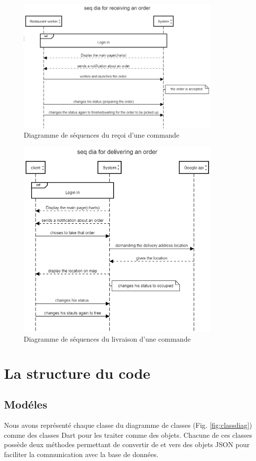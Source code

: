 \documentclass[french, a4paper, french]{report}
\begin{document}
			\begin{figure}[!h]
  				\center
  				\includegraphics[width=10cm]{seqrest.png}
  				\caption{Diagramme de séquences du reçoi d'une commande}
  				\label{fig:seqrest}
			\end{figure}
			\begin{figure}[!h]
  				\center
  				\includegraphics[width=10cm]{seqdeliver.png}
  				\caption{Diagramme de séquences du livraison d'une commande}
  				\label{fig:seqdeliver}
			\end{figure}
			
	\section{La structure du code}
		\subsection{Modéles} Nous avons représenté chaque classe du diagramme de classes (Fig. \ref{fig:classdiag}) comme des classes Dart pour les traiter comme des objets. Chacune de ces classes possède deux méthodes permettant de convertir de et vers des objets JSON  pour faciliter la communication avec la base de données.
\end{document}
